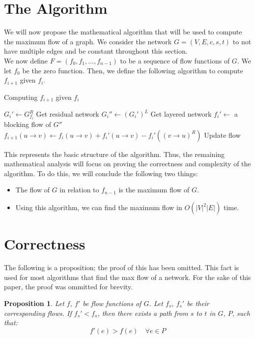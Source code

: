 \documentclass{report}
\newtheorem{proposition}{Proposition}[section]
\begin{document}
\section{The Algorithm}
We will now propose the mathematical algorithm that will be used to compute the maximum flow of a graph. We consider the network $G = (V, E, c, s, t)$ to not have multiple edges and be constant throughout this section.\\
We now define $F = (f_0, f_1, ..., f_{n-1})$ to be a sequence of flow functions of $G$. We let $f_0$ be the zero function. Then, we define the following algorithm to compute $f_{i+1}$ given $f_i$.
\begin{algorithm}
\caption{Computing $f_{i+1}$ given $f_i$}\label{alg:cap}
\begin{algorithmic}
    \State $G_i' \gets G_{f_i}^R$ \Comment Get residual network
    \State $G_i'' \gets (G_i')^L$ \Comment Get layered network
    \State $f_i' \gets$ a blocking flow of $G''$
    \State $f_{i+1}(u \rightarrow v) \gets f_i(u \rightarrow v) + f_i'(u \rightarrow v) - f_i'((v \rightarrow u)^R)$ \Comment Update flow
\end{algorithmic}
\end{algorithm}
This represents the basic structure of the algorithm. Thus, the remaining mathematical analysis will focus on proving the correctness and complexity of the algorithm. To do this, we will conclude the following two things:
\begin{itemize}
    \item
        The flow of $G$ in relation to $f_{n-1}$ is the maximum flow of $G$.
    \item
        Using this algorithm, we can find the maximum flow in $O(|V|^2|E|)$ time.
\end{itemize}

\section{Correctness}
The following is a proposition; the proof of this has been omitted. This fact is used for most algorithms that find the max flow of a network. For the sake of this paper, the proof was ommitted for brevity.
\begin{proposition}
    Let $f$, $f'$ be flow functions of $G$. Let $f_s$, $f_s'$ be their corresponding flows. If $f_s' < f_s$, then there exists a path from $s$ to $t$ in $G$, $P$, such that:
    $$f'(e) > f(e) \quad \forall e \in P$$
\end{proposition}
\end{document}
